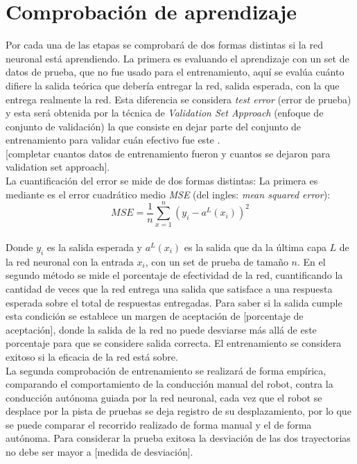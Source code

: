 \documentclass{iccmemoria}
\begin{document}
\section{Comprobación de aprendizaje}

Por cada una de las etapas se comprobará de dos formas distintas si la red neuronal está aprendiendo. La primera es evaluando el aprendizaje con un set de datos de prueba, que no fue usado para el entrenamiento, aquí se evalúa cuánto difiere la salida teórica que debería entregar la red, salida esperada, con la que entrega realmente la red. Esta diferencia se considera \emph{test error} (error de prueba) y esta será obtenida por la técnica de \emph{Validation Set Approach} (enfoque de conjunto de validación) la que consiste en dejar parte del conjunto de entrenamiento para validar cuán efectivo fue este \cite{james2014introduction}.\\
 
[completar cuantos datos de entrenamiento fueron y cuantos se dejaron para validation set approach].\\
 
La cuantificación del error se mide de dos formas distintas: La primera es mediante es el error cuadrático medio \emph{MSE} (del ingles: \emph{mean squared error}):\\

\begin{equation}
	MSE = \frac{1}{n} \sum^n_{x=1} (y_i-a^L(x_i))^2
\end{equation}\\

Donde $y_i$ es la salida esperada y $a^L(x_i)$ es la salida que da la última capa $L$ de la red neuronal con la entrada $x_i$, con un set de prueba de tamaño $n$. En el segundo método se mide el porcentaje de efectividad de la red, cuantificando la cantidad de veces que la red entrega una salida que satisface a una respuesta esperada sobre el total de respuestas entregadas. Para saber si la salida cumple esta condición se establece un margen de aceptación de [porcentaje de aceptación], donde la salida de la red no puede desviarse más allá de este porcentaje para que se considere salida correcta. El entrenamiento se considera exitoso si la eficacia de la red está sobre.\\
 
La segunda comprobación de entrenamiento se realizará de forma empírica, comparando el comportamiento de la conducción manual del robot, contra la conducción autónoma guiada por la red neuronal, cada vez que el robot se desplace por la pista de pruebas se deja registro de su desplazamiento, por lo que se puede comparar el recorrido realizado de forma manual y el de forma autónoma. Para considerar la prueba exitosa la desviación de las dos trayectorias no debe ser mayor a [medida de desviación].\\
 
\end{document}
